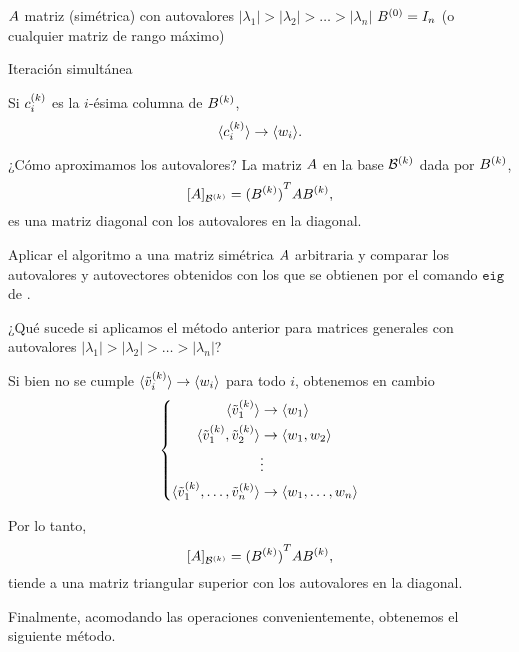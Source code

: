 {\small
\begin{algorithm}[H]
\SetAlgoLined
$\Ab$ matriz (simétrica) con autovalores $|\lambda_1| > |\lambda_2| > \dots > |\lambda_n|$\;
$\Bb^{(0)} = \Ib_n$ (o cualquier matriz de rango máximo)\;
 \caption{Iteración simultánea}
\end{algorithm}
}

Si $\cb_i^{(k)}$ es la $i$-ésima columna de $\Bb^{(k)}$,
$$
\langle \cb_i^{(k)} \rangle \rightarrow \langle \wb_i \rangle.
$$

¿Cómo aproximamos los autovalores? La matriz $\Ab$ en la base $\mathcal B^{(k)}$ dada por $\Bb^{(k)}$,
$$
[\Ab]_{\B^{(k)}} = {(\Bb^{(k)})}^T \Ab \Bb^{(k)},
$$
es una matriz diagonal con los autovalores en la diagonal.


\begin{ejercicio} Aplicar el algoritmo a una matriz simétrica $\Ab$ arbitraria y comparar los autovalores y autovectores obtenidos con los que se obtienen por el comando $\texttt{eig}$ de \python.
\end{ejercicio}


¿Qué sucede si aplicamos el método anterior para matrices generales con autovalores  $|\lambda_1| > |\lambda_2| > \dots > |\lambda_n|$?

Si bien no se cumple $\langle \tilde \vb_i^{(k)} \rangle \rightarrow \langle \wb_i \rangle$ para todo $i$, obtenemos en cambio
$$
\left\{
\begin{aligned}
\langle \tilde \vb_1^{(k)} \rangle &\rightarrow \langle \wb_1 \rangle \\
\langle \tilde \vb_1^{(k)}, \tilde \vb_2^{(k)} \rangle &\rightarrow \langle \wb_1, \wb_2 \rangle \\
&\vdots \\
\langle \tilde \vb_1^{(k)}, \dots, \tilde \vb_n^{(k)} \rangle &\rightarrow \langle \wb_1, \dots, \wb_n \rangle \\
\end{aligned}
\right.
$$

Por lo tanto,
$$
[\Ab]_{\B^{(k)}} = {(\Bb^{(k)})}^T \Ab \Bb^{(k)},
$$
tiende a una matriz triangular superior con los autovalores en la diagonal.

Finalmente, acomodando las operaciones  convenientemente, obtenemos el siguiente método.

